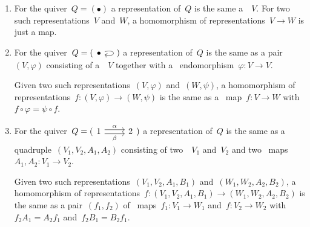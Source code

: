 \begin{example}
  \leavevmode
  \begin{enumerate}
    \item
      For the quiver~$Q = (\bullet)$ a representation of~$Q$ is the same a~{\module{$\kf$}}~$V$.
      For two such representations~$V$ and~$W$, a homomorphism of representations~$V \to W$ is just a {\klin} map.
    \item
      For the quiver~$Q = (\begin{tikzcd} \bullet \arrow[loop right] \end{tikzcd})$ a representation of~$Q$ is the same as a pair~$(V,\varphi)$ consisting of a~{\module{$\kf$}}~$V$ together with a~{\klin} endomorphism~$\varphi \colon V \to V$.
      
      Given two such representations~$(V, \varphi)$ and~$(W,\psi)$, a homomorphism of representations~$f \colon (V,\varphi) \to (W,\psi)$ is the same as a~{\klin} map~$f \colon V \to W$ with~$f \circ \varphi = \psi \circ f$.
    \item
      For the quiver~$Q = (\begin{tikzcd} 1 \arrow[shift left]{r}[above]{\alpha} \arrow[shift right]{r}[below]{\beta} & 2 \end{tikzcd})$ a representation of~$Q$ is the same as a quadruple~$(V_1,V_2,A_1,A_2)$ consisting of two~{\modules{$\kf$}}~$V_1$ and~$V_2$ and two~{\klin} maps~$A_1, A_2 \colon V_1 \to V_2$.
      
      Given two such representations~$(V_1, V_2, A_1, B_1)$ and~$(W_1, W_2, A_2, B_2)$, a homomorphism of representations~$f \colon (V_1, V_2, A_1, B_1) \to (W_1, W_2, A_2, B_2)$ is the same as a pair~$(f_1, f_2)$ of~{\klin} maps~$f_1 \colon V_1 \to W_1$ and~$f \colon V_2 \to W_2$ with~$f_2 A_1 = A_2 f_1$ and~$f_2 B_1 = B_2 f_1$.
  \end{enumerate}
\end{example}









